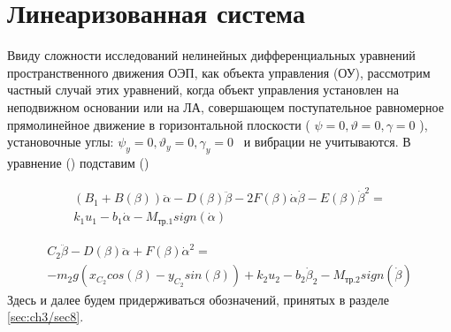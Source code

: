 \section{Линеаризованная система} \label{ch:ch3/sect10}

Ввиду сложности исследований нелинейных дифференциальных уравнений пространственного движения ОЭП, как объекта управления (ОУ), рассмотрим частный случай этих уравнений, когда объект управления установлен на неподвижном основании или на ЛА, совершающем поступательное равномерное прямолинейное движение в горизонтальной плоскости ( \( \psi =0, \vartheta =0, \gamma =0 \) ), установочные углы: \( \psi _{y}=0, \vartheta _{y}=0, \gamma _{y}=0 \) \ и вибрации не учитываются. В уравнение () подставим ()

\begin{equation}%
\label{eq:p3:50}
\begin{multlined}
\left( B_{1}+B \left( \beta \right) \right) \ddot \alpha -D \left( \beta \right) \ddot \beta -2F \left( \beta \right) \dot \alpha \dot \beta -E \left( \beta \right) \dot \beta ^{2}=\\
k_{1}u_{1}-b_{1} \dot \alpha -M_{\textit{тр.1}}sign \left( \dot \alpha \right) 
\end{multlined}
\end{equation}

\begin{equation}%
\label{eq:p3:51}
\begin{multlined}
C_{2} \ddot \beta -D \left( \beta \right) \ddot \alpha +F \left( \beta \right) \dot \alpha ^{2}=\\
-m_{2}g \left( 
x_{C_{2}}cos \left( \beta \right) -
y_{C_{2}}sin \left( \beta \right) 
\right) 
+k_{2}u_{2}-
b_{2} \dot \beta _{2}-M_{\textit{тр.2}}sign \left( \dot \beta \right) 
\end{multlined}
\end{equation}
Здесь и далее будем придерживаться обозначений, принятых в разделе \ref{sec:ch3/sec8}. 

